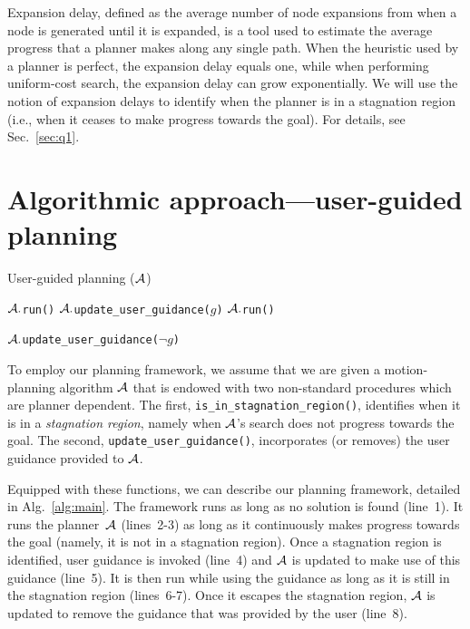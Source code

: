 \documentclass{article}
\begin{document}
Expansion delay, defined as the average number of node expansions from when a node is generated until it is expanded, is a tool used to estimate the average progress that a planner makes along any single path.
When the heuristic used by a planner is perfect, the expansion delay equals one, while when performing uniform-cost search, the expansion delay can grow exponentially.
We will use the notion of expansion delays to identify when the planner is in a stagnation region (i.e., when it ceases to make progress towards the goal). For details, see Sec.~\ref{sec:q1}.



\section{Algorithmic approach---user-guided planning}
\label{sec:high}

\algrenewcommand\algorithmicindent{.8em}
\begin{algorithm}[tb]
\caption{User-guided planning ($\mathcal{A}$)}
\label{alg:main}	
\begin{algorithmic}[1]
\small
{} 
		\State $\mathcal{A}.$\texttt{run()}
	\EndWhile
%	
	\State $\mathcal{A}.$\texttt{update\_user\_guidance($g$)}
		\State $\mathcal{A}.$\texttt{run()}
	\EndWhile

	\State $\mathcal{A}.$\texttt{update\_user\_guidance($\neg g$)}
\EndWhile
\end{algorithmic}
\end{algorithm}

To employ our planning framework, we assume that we are given a motion-planning algorithm $\mathcal{A}$ that is endowed with two non-standard procedures which are planner dependent.
The first, \texttt{is\_in\_stagnation\_region()}, 
identifies when it is in a \emph{stagnation region}, namely when $\mathcal{A}$'s search does not progress towards the goal. 
The second, \texttt{update\_user\_guidance()}, 
incorporates (or removes) the user guidance provided to $\mathcal{A}$. 

Equipped with these functions, we can describe our planning framework, detailed in Alg.~\ref{alg:main}.
The framework runs as long as no solution is found (line~1).
It runs the planner~$\mathcal{A}$ (lines~2-3) as long as it continuously makes progress towards the goal (namely, it is not in a stagnation region).
Once a stagnation region is identified, user guidance is invoked (line~4) and $\mathcal{A}$  is updated to make use of this guidance (line~5).
It is then run while using the guidance as long as it is still in the stagnation region (lines~6-7).
Once it escapes the stagnation region, $\mathcal{A}$ is updated to remove the guidance that was provided by the user (line~8).
\end{document}
